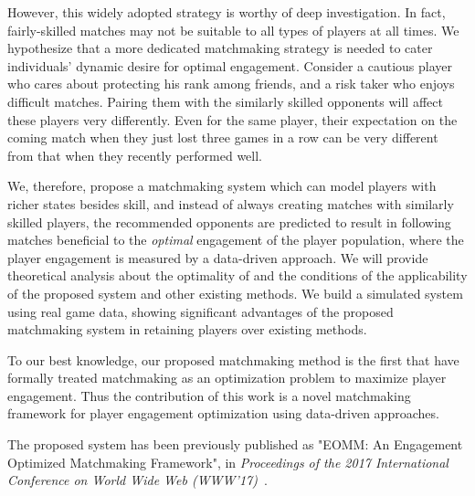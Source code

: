 However, this widely adopted strategy is worthy of deep investigation. In fact, fairly-skilled matches may not be suitable to all types of players at all times. We hypothesize that a more dedicated matchmaking strategy is needed to cater individuals' dynamic desire for optimal engagement. Consider a cautious player who cares about protecting his rank among friends, and a risk taker who enjoys difficult matches. Pairing them with the similarly skilled opponents will affect these players very differently. Even for the same player, their expectation on the coming match when they just lost three games in a row can be very different from that when they recently performed well. 

We, therefore, propose a matchmaking system which can model players with richer states besides skill, and instead of always creating matches with similarly skilled players, the recommended opponents are predicted to result in following matches beneficial to the \textit{optimal} engagement of the  player population, where the player engagement is measured by a data-driven approach. We will provide theoretical analysis about the optimality of and the conditions of the applicability of the proposed system and other existing methods. We build a simulated system using real game data, showing significant advantages of the proposed matchmaking system in retaining players over existing methods. 

To our best knowledge, our proposed matchmaking method is the first that have formally treated matchmaking as an
optimization problem to maximize player engagement. Thus the contribution of this work is a novel matchmaking framework for player engagement optimization using data-driven approaches.

The proposed system has been previously published as "EOMM: An Engagement Optimized Matchmaking Framework", in \textit{Proceedings of the 2017 International Conference on World Wide Web (WWW'17)}~\cite{chen2017eomm}.




